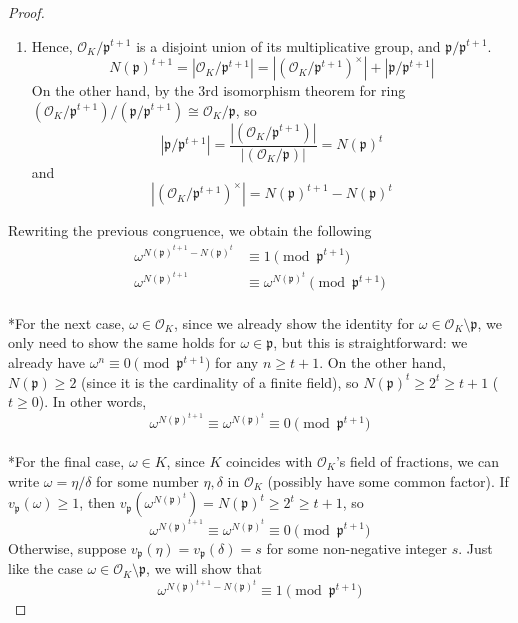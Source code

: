 \documentclass{treatise}
\begin{document}
\begin{proof}
\begin{enumerate}
	\item Hence, $\mathcal{O}_K / \mathfrak{p}^{t + 1}$ is a disjoint union of its multiplicative group, and $\mathfrak{p} / \mathfrak{p}^{t + 1}$.
	$$N(\mathfrak{p})^{t + 1} = |\mathcal{O}_K / \mathfrak{p}^{t + 1}| = |(\mathcal{O}_K / \mathfrak{p}^{t + 1})^\times| + |\mathfrak{p} / \mathfrak{p}^{t + 1}|$$
	On the other hand, by the 3rd isomorphism theorem for ring $(\mathcal{O}_K / \mathfrak{p}^{t + 1})/(\mathfrak{p} / \mathfrak{p}^{t + 1}) \cong \mathcal{O}_K / \mathfrak{p}$, so
	$$|\mathfrak{p} / \mathfrak{p}^{t + 1}| = \frac{|(\mathcal{O}_K / \mathfrak{p}^{t + 1})|}{|(\mathcal{O}_K / \mathfrak{p})|} = N(\mathfrak{p})^t$$
	and
	$$|(\mathcal{O}_K / \mathfrak{p}^{t + 1})^\times| = N(\mathfrak{p})^{t + 1} - N(\mathfrak{p})^t$$
\end{enumerate}
Rewriting the previous congruence, we obtain the following
\begin{align*}
\omega^{N(\mathfrak{p})^{t + 1} - N(\mathfrak{p})^t} & \equiv 1 \pmod{\mathfrak{p}^{t + 1}} \\
\omega^{N(\mathfrak{p})^{t + 1}} & \equiv \omega^{N(\mathfrak{p})^t} \pmod{\mathfrak{p}^{t + 1}}
\end{align*}
\\
*For the next case, $\omega \in \mathcal{O}_K$, since we already show the identity for $\omega \in \mathcal{O}_K \setminus \mathfrak{p}$, we only need to show the same holds for $\omega \in \mathfrak{p}$, but this is straightforward: we already have $\omega^n \equiv 0 \pmod{\mathfrak{p}^{t + 1}}$ for any $n \geq t + 1$. On the other hand, $N(\mathfrak{p}) \geq 2$ (since it is the cardinality of a finite field), so $N(\mathfrak{p})^t \geq 2^t \geq t + 1$ ($t \geq 0$). In other words,
$$\omega^{N(\mathfrak{p})^{t + 1}} \equiv \omega^{N(\mathfrak{p})^t} \equiv 0 \pmod{\mathfrak{p}^{t + 1}}$$
\\
*For the final case, $\omega \in K$, since $K$ coincides with $\mathcal{O}_K$'s field of fractions, we can write $\omega = \eta / \delta$ for some number $\eta, \delta$ in $\mathcal{O}_K$ (possibly have some common factor). If $v_\mathfrak{p} (\omega) \geq 1$, then $v_\mathfrak{p} (\omega^{N(\mathfrak{p})^t}) = N(\mathfrak{p})^t \geq 2^t \geq t + 1$, so
$$\omega^{N(\mathfrak{p})^{t + 1}} \equiv \omega^{N(\mathfrak{p})^t} \equiv 0 \pmod{\mathfrak{p}^{t + 1}}$$
Otherwise, suppose $v_\mathfrak{p} (\eta) = v_\mathfrak{p} (\delta) = s$ for some non-negative integer $s$. Just like the case $\omega \in \mathcal{O}_K \setminus \mathfrak{p}$, we will show that
$$\omega^{N(\mathfrak{p})^{t + 1} - N(\mathfrak{p})^t} \equiv 1 \pmod{\mathfrak{p}^{t + 1}}$$

\end{proof}
\end{document}
